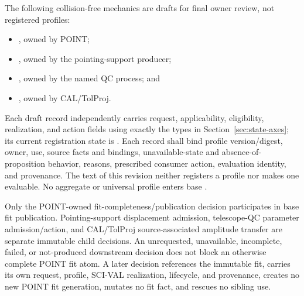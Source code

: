 The following collision-free mechanics are drafts for final owner review, not
registered profiles:
\begin{itemize}
\item {}, owned by POINT;
\item {}, owned by the pointing-support producer;
\item {}, owned by the named QC process; and
\item {}, owned by CAL/TolProj.
\end{itemize}
Each draft record independently carries request, applicability, eligibility,
realization, and action fields using exactly the types in
Section~\ref{sec:state-axes}; its current registration state is
. Each record shall bind profile version/digest, owner, use,
source facts and bindings, unavailable-state and absence-of-proposition
behavior, reasons, prescribed
consumer action, evaluation identity, and provenance. The text of this
revision neither registers a profile nor makes one evaluable. No aggregate or
universal profile enters base \ContractVersion.

Only the POINT-owned fit-completeness/publication decision participates in
base fit publication. Pointing-support displacement admission, telescope-QC
parameter admission/action, and CAL/TolProj source-associated amplitude
transfer are separate immutable child decisions. An unrequested, unavailable,
incomplete, failed, or not-produced downstream decision does not block an
otherwise complete POINT fit atom. A later decision references the immutable
fit, carries its own request, profile, SCI-VAL realization, lifecycle, and
provenance, creates no new POINT fit generation, mutates no fit fact, and
rescues no sibling use.
